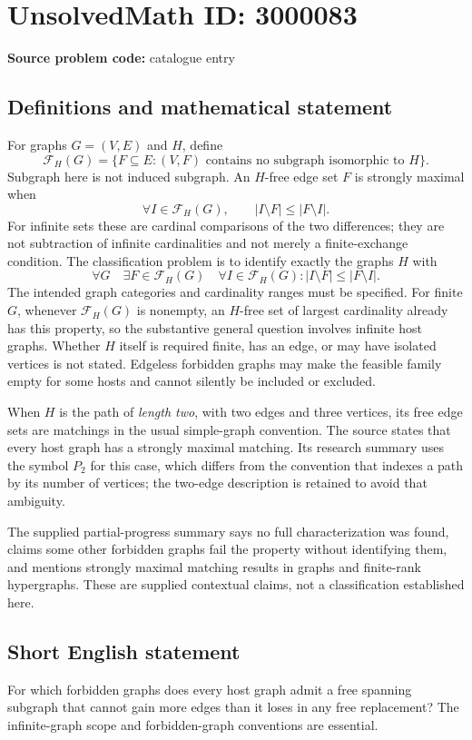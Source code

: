 \documentclass[11pt]{article}
\begin{document}
\section*{UnsolvedMath ID: 3000083}
\textbf{Source problem code:} catalogue entry
\subsection{Definitions and mathematical statement}
For graphs \(G=(V,E)\) and \(H\), define
\[
\mathcal F_H(G)=\{F\subseteq E:(V,F)\text{ contains no subgraph isomorphic to }H\}.
\]
Subgraph here is not induced subgraph. An \(H\)-free edge set \(F\) is strongly maximal when
\[
\forall I\in\mathcal F_H(G),\qquad |I\setminus F|\le|F\setminus I|.
\]
For infinite sets these are cardinal comparisons of the two differences; they are not subtraction of infinite cardinalities and not merely a finite-exchange condition. The classification problem is to identify exactly the graphs \(H\) with
\[
\forall G\quad\exists F\in\mathcal F_H(G)\quad
\forall I\in\mathcal F_H(G):|I\setminus F|\le|F\setminus I|.
\]
The intended graph categories and cardinality ranges must be specified. For finite \(G\), whenever \(\mathcal F_H(G)\) is nonempty, an \(H\)-free set of largest cardinality already has this property, so the substantive general question involves infinite host graphs. Whether \(H\) itself is required finite, has an edge, or may have isolated vertices is not stated. Edgeless forbidden graphs may make the feasible family empty for some hosts and cannot silently be included or excluded.

When \(H\) is the path of \emph{length two}, with two edges and three vertices, its free edge sets are matchings in the usual simple-graph convention. The source states that every host graph has a strongly maximal matching. Its research summary uses the symbol \(P_2\) for this case, which differs from the convention that indexes a path by its number of vertices; the two-edge description is retained to avoid that ambiguity.

The supplied partial-progress summary says no full characterization was found, claims some other forbidden graphs fail the property without identifying them, and mentions strongly maximal matching results in graphs and finite-rank hypergraphs. These are supplied contextual claims, not a classification established here.
\subsection{Short English statement}
For which forbidden graphs does every host graph admit a free spanning subgraph that cannot gain more edges than it loses in any free replacement? The infinite-graph scope and forbidden-graph conventions are essential.
\end{document}

